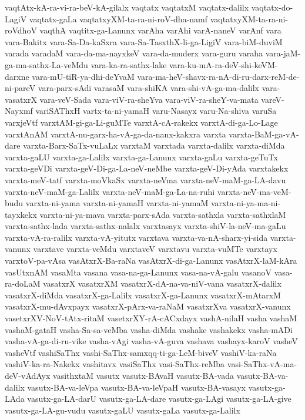{vaqtAtx-kA-ra-vi-ra-beV-kA-gilalx
vaqtatx
vaqtatxM
vaqtatx-dalilx
vaqtatx-do-LagiV
vaqtatx-gaLa
vaqtatxyXM-ta-ra-ni-roV-dha-namf
vaqtatxyXM-ta-ra-ni-roVdhoV
vaqthA
vaqtitx-ga-Lanunx
varAha
varAhi
varA-naneV
varAnf
vara
vara-Bakitx
vara-Sa-Da-kaSxra
vara-Sa-TasxthX-li-ga-LigiV
vara-biM-duviM
varada
varadaM
vara-da-ma-nayxkeV
vara-da-muderx
vara-guru
varaha
vara-jaM-ga-ma-sathx-La-veMdu
vara-ka-ra-sathx-lake
vara-ku-mA-ra-deV-shi-keVM-darxne
vara-mU-tiR-ya-dhi-deYvaM
vara-ma-heV-shavx-ra-nA-di-ru-darx-reM-de-ni-pareV
vara-parx-sAdi
varasaM
vara-shiKA
vara-shi-vA-ga-ma-dalilx
vara-vasatxrX
vara-veV-Sada
vara-viV-ra-sheYva
vara-viV-ra-sheY-va-mata
vareV-Nayxmf
variSAThxH
vartx-ta-ni-yamaH
varu-Nasayx
varu-Na-shiva
varuSa
varxjeVtf
varxtAM-gi-ga-Li-guMTe
varxtA-cA-rakekx
varxtA-di-ga-Lo-Lage
varxtAnAM
varxtA-nu-garx-ha-vA-ga-da-nanx-kakxra
varxta
varxta-BaM-ga-vA-dare
varxta-Barx-SaTx-vuLaLx
varxtaM
varxtada
varxta-dalilx
varxta-diMda
varxta-gaLU
varxta-ga-Lalilx
varxta-ga-Lanunx
varxta-gaLu
varxta-geTuTx
varxta-geVDi
varxta-geV-Di-ga-La-neV-neMbe
varxta-geV-Di-yAda
varxtakekx
varxta-meV-tatf
varxta-moVkaSx
varxta-neVma
varxta-neV-maM-ga-LA-davu
varxta-neV-maM-ga-Lalilx
varxta-neV-maM-ga-La-na-ruhi
varxta-neV-ma-veM-budu
varxta-ni-yama
varxta-ni-yamaH
varxta-ni-yamaM
varxta-ni-ya-ma-ni-tayxkekx
varxta-ni-ya-mava
varxta-parx-sAda
varxta-sathxla
varxta-sathxlaM
varxta-sathx-lada
varxta-sathx-nalalx
varxtasayx
varxta-shiV-la-neV-ma-gaLu
varxta-vA-ra-ralilx
varxta-vA-yitutx
varxtava
varxta-va-nA-sharx-yi-sida
varxta-vanunx
varxtave
varxta-veMdu
varxtaveV
varxtavu
varxta-vuMTe
varxtayx
varxtoV-pa-vAsa
vasAtxrX-Ba-raNa
vasAtxrX-di-ga-Lanunx
vasAtxrX-laM-kAra
vasUtxnAM
vasaMta
vasana
vasa-na-ga-Lanunx
vasa-na-vA-galu
vasanoV
vasa-ra-doLaM
vasatxrX
vasatxrXM
vasatxrX-dA-na-va-niV-vana
vasatxrX-dalilx
vasatxrX-diMda
vasatxrX-ga-Lalilx
vasatxrX-ga-Lanunx
vasatxrX-mAtarxM
vasatxrX-mu-dAvxpayx
vasatxrX-pArx-va-raNaM
vasatxrXva
vasatxrX-vanunx
vasetxrXV-NoV-tAtx-ritaM
vasetxrXY-rA-cACxdayx
vashA-nilaH
vasha
vashaM
vashaM-gataH
vasha-Sa-sa-veMba
vasha-diMda
vashake
vashakekx
vasha-mADi
vasha-vA-ga-di-ru-vike
vasha-vAgi
vasha-vA-guva
vashava
vashayx-karoV
vasheV
vasheVtf
vashiSaThx
vashi-SaThx-samxqq-ti-ga-LeM-biveV
vashiV-ka-raNa
vashiV-ka-ra-Nakekx
vashitavx
vasiSaThx
vasi-SaThx-reMba
vasi-SaThx-vA-ma-deV-vAdAyx
vasithxtaM
vasutx
vasutx-BAvaH
vasutx-BA-vada
vasutx-BA-va-dalilx
vasutx-BA-va-leVpa
vasutx-BA-va-leVpaH
vasutx-BA-vasayx
vasutx-ga-LAda
vasutx-ga-LA-darU
vasutx-ga-LA-dare
vasutx-ga-LAgi
vasutx-ga-LA-give
vasutx-ga-LA-gu-vudu
vasutx-gaLU
vasutx-gaLa
vasutx-ga-Lalilx
}
